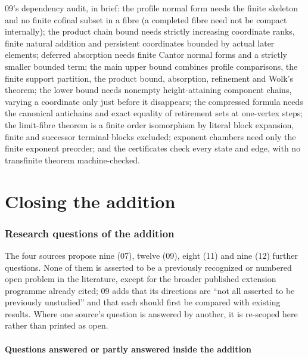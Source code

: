 \documentclass[11pt,a4paper]{article}
\theoremstyle{definition}
\theoremstyle{remark}
\begin{document}
09's dependency audit, in brief: the profile normal form needs the finite
skeleton and no finite cofinal subset in a fibre (a completed fibre need not
be compact internally); the product chain bound needs strictly increasing
coordinate ranks, finite natural addition and persistent coordinates bounded
by actual later elements; deferred absorption needs finite Cantor normal forms
and a strictly smaller bounded term; the main upper bound combines profile
comparisons, the finite support partition, the product bound, absorption,
refinement and Wolk's theorem; the lower bound needs nonempty height-attaining
component chains, varying a coordinate only just before it disappears; the
compressed formula needs the canonical antichains and exact equality of
retirement sets at one-vertex steps; the limit-fibre theorem is a finite order
isomorphism by literal block expansion, finite and successor terminal blocks
excluded; exponent chambers need only the finite exponent preorder; and the
certificates check every state and edge, with no transfinite theorem
machine-checked.
\clearpage
{}\part*{Closing the addition}

\section{Research questions of the addition}\label{nh:sec:questions}

The four sources propose nine (07), twelve (09), eight (11) and nine (12) further
questions. None of them is asserted to be a previously recognized or numbered open
problem in the literature, except for the broader published extension programme
already cited; 09 adds that its directions are ``not all asserted to be previously
unstudied'' and that each should first be compared with existing results. Where
one source's question is answered by another, it is re-scoped here rather than
printed as open.

\subsection{Questions answered or partly answered inside the addition}
\end{document}
